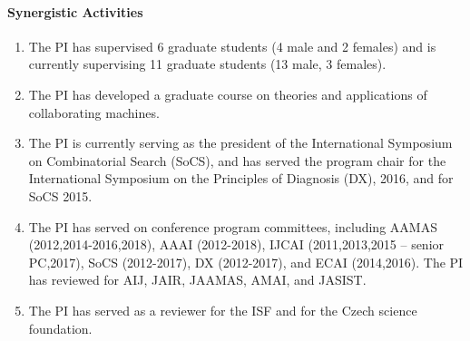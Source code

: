 \documentclass[12pt]{article}
\begin{document}
{\begin{itemize}
\end{itemize}
\paragraph{Synergistic Activities}
\begin{enumerate}
\item The PI has supervised 6 graduate students (4 male and 2 females) and is currently supervising 11 graduate students (13 male, 3 females). 
\item The PI has developed a graduate course on theories and applications of collaborating machines. 
\item The PI is currently serving as the president of the International Symposium on Combinatorial Search (SoCS), and has served 
the program chair for the International Symposium on the Principles of Diagnosis (DX), 2016, and for SoCS 2015. 
\item The PI has served on conference program committees, including AAMAS (2012,2014-2016,2018), AAAI (2012-2018), IJCAI (2011,2013,2015 -- senior PC,2017), SoCS (2012-2017), DX (2012-2017), and ECAI (2014,2016). 
The PI has reviewed for AIJ, JAIR, JAAMAS, AMAI, and JASIST.
\item The PI has served as a reviewer for the ISF and for the Czech science foundation. 
\end{enumerate}
}
\end{document}
